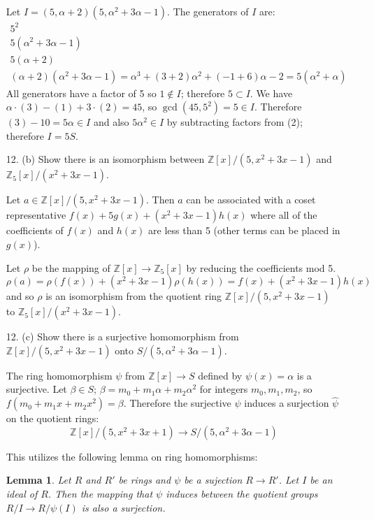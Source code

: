 \documentclass{article}
\newcommand{\Z}[0]{\mathbb{Z}}
\newtheorem{lemma}{Lemma}
\begin{document}
\begin{enumerate}
Let $I = (5, \alpha + 2)(5, \alpha^2 + 3\alpha - 1)$.  The generators of $I$ are: \setcounter{equation}{0}\begin{gather}5^2 \\ 5(\alpha^2 + 3\alpha -1)\\ 5(\alpha + 2)\\ (\alpha + 2)(\alpha^2 + 3\alpha -1) = \alpha^3 + (3 + 2)\alpha^2 + (-1 + 6)\alpha - 2 = 5(\alpha^2 + \alpha) \end{gather}
All generators have a factor of 5 so $1 \not\in I$; therefore $5 \subset I$.  We have $\alpha \cdot (3) - (1) + 3 \cdot (2) = 45$, so $\gcd(45, 5^2) = 5 \in I$.  Therefore $(3) - 10 = 5\alpha \in I$ and also $5\alpha^2 \in I$ by subtracting factors from (2); therefore $I = 5S$.

\item[12. (b)] Show there is an isomorphism between $\Z[x] / (5, x^2 + 3x - 1)$ and $\Z_{5}[x]/(x^2 + 3x - 1)$.

Let $a \in \Z[x] / (5, x^2 + 3x - 1)$.  Then $a$ can be associated with a coset representative $f(x) + 5g(x) + (x^2 + 3x - 1)h(x)$ where all of the coefficients of $f(x)$ and $h(x)$ are less than 5 (other terms can be placed in $g(x)$).

Let $\rho$ be the mapping of $\Z[x] \to \Z_5[x]$ by reducing the coefficients mod 5. $\rho(a) = \rho(f(x)) + (x^2 + 3x - 1)\rho(h(x)) = f(x) + (x^2 + 3x - 1)h(x)$ and so $\rho$ is an isomorphism from the quotient ring $\Z[x] / (5, x^2 + 3x - 1)$ to $\Z_5[x]/(x^2 + 3x - 1)$.

\item[12. (c)]  Show there is a surjective homomorphism from $\Z[x] / (5, x^2 + 3x - 1)$ onto $S / (5, \alpha^2 + 3\alpha - 1)$.

The ring homomorphism $\psi$ from $\Z[x] \to S$ defined by $\psi(x) = \alpha$ is a surjective.  Let $\beta \in S$; $\beta = m_0 + m_1\alpha + m_2\alpha^2$ for integers $m_0, m_1, m_2$, so $f(m_0 + m_1x + m_2x^2) = \beta$.  Therefore the surjective $\psi$ induces a surjection $\hat{\psi}$ on the quotient rings: \[ \Z[x] / (5, x^2 + 3x + 1) \to S / (5, \alpha^2 + 3\alpha - 1) \]

This utilizes the following lemma on ring homomorphisms:

\begin{lemma}
Let $R$ and $R'$ be rings and $\psi$ be a sujection $R \to R'$.  Let $I$ be an ideal of $R$.  Then the mapping that $\psi$ induces between the quotient groups $R / I \to R / \psi(I)$ is also a surjection.
\end{lemma}


\end{enumerate}
\end{document}
